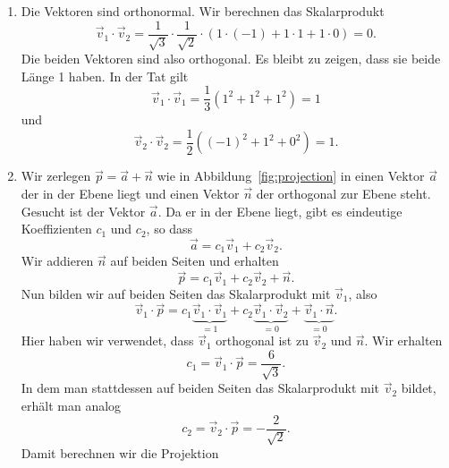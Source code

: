 \begin{losung*}
	\phantom{text}
	\begin{enumerate}[label=(\alph*)]
		\item Die Vektoren sind orthonormal. Wir berechnen das Skalarprodukt
		\begin{equation*}
			\vec v_1\cdot\vec v_2= \frac{1}{\sqrt{3}}\cdot\frac{1}{\sqrt{2}}\cdot\left(1\cdot\left(-1\right)+1\cdot 1+1\cdot 0\right)=0.
		\end{equation*}
		Die beiden Vektoren sind also orthogonal.
		Es bleibt zu zeigen, dass sie beide Länge 1 haben. In der Tat gilt
		\begin{equation*}
			\vec v_1\cdot\vec v_1=\frac{1}{3}\left(1^2+1^2+1^2\right)=1
		\end{equation*}
		und
		\begin{equation*}
			\vec v_2\cdot\vec v_2=\frac{1}{2}\left(\left(-1\right)^2+1^2+0^2\right)=1.
		\end{equation*}
		\item Wir zerlegen $\vec p=\vec a+\vec n$ wie in Abbildung~\ref{fig:projection} in einen Vektor $\vec a$ der in der Ebene liegt und einen Vektor $\vec n$ der orthogonal zur Ebene steht.
		Gesucht ist der Vektor $\vec a$.
		Da er in der Ebene liegt, gibt es eindeutige Koeffizienten $c_1$ und $c_2$, so dass
		\begin{equation*}
			\vec a=c_1\vec v_1+c_2\vec v_2.
		\end{equation*}
		Wir addieren $\vec n$ auf beiden Seiten und erhalten
		\begin{equation*}
			\vec p=c_1\vec v_1+c_2\vec v_2+\vec n.
		\end{equation*}
		Nun bilden wir auf beiden Seiten das Skalarprodukt mit $\vec v_1$, also
		\begin{equation*}
			\vec v_1\cdot\vec p=c_1\underbrace{\vec v_1\cdot\vec v_1}_{=1}+c_2\underbrace{\vec v_1\cdot\vec v_2}_{=0}+\underbrace{\vec v_1\cdot\vec n}_{=0}.
		\end{equation*}
		Hier haben wir verwendet, dass $\vec v_1$ orthogonal ist zu $\vec v_2$ und $\vec n$.
		Wir erhalten
		\begin{equation*}
			c_1=\vec v_1\cdot\vec p=\frac{6}{\sqrt{3}}.
		\end{equation*}
		In dem man stattdessen auf beiden Seiten das Skalarprodukt mit $\vec v_2$ bildet, erhält man analog
		\begin{equation*}
			c_2=\vec v_2\cdot\vec p=-\frac{2}{\sqrt{2}}.
		\end{equation*}
		Damit berechnen wir die Projektion

\end{enumerate}
\end{losung*}
